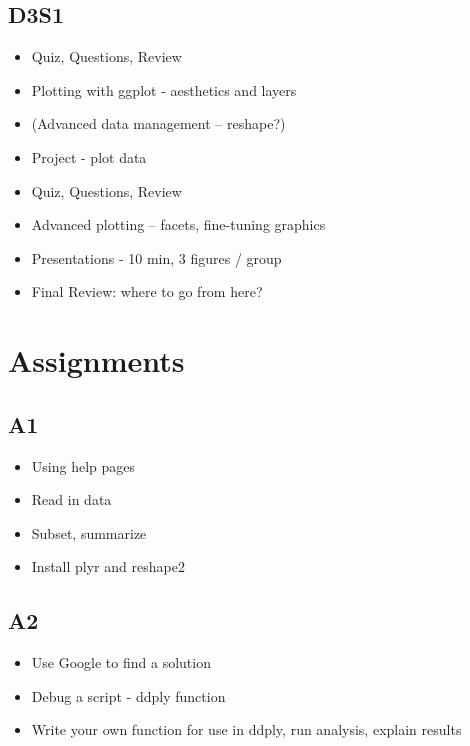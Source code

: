 \documentclass[english, letterpaper, 12pt]{article}
\begin{document}
\subsection*{D3S1}
\begin{itemize}
    \item Quiz, Questions, Review
    \item Plotting with ggplot - aesthetics and layers
    \item (Advanced data management -- reshape?)
    \item Project - plot data
\end{itemize}
\begin{itemize}
    \item Quiz, Questions, Review
    \item Advanced plotting -- facets, fine-tuning graphics
    \item Presentations - 10 min, 3 figures / group
    \item Final Review: where to go from here?
\end{itemize}

\section*{Assignments}
\subsection*{A1}
\begin{itemize}
    \item Using help pages
    \item Read in data
    \item Subset, summarize
    \item Install plyr and reshape2
\end{itemize}

\subsection*{A2}
\begin{itemize}
    \item Use Google to find a solution
    \item Debug a script - ddply function
    \item Write your own function for use in ddply, run analysis, explain
results
\end{itemize}
\end{document}
